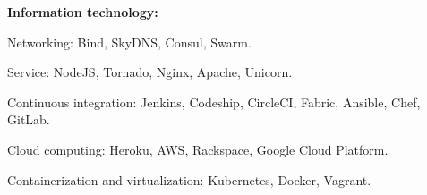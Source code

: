 \textbf{Information technology:} 
    \begin{innerlist}
\item Networking: Bind, SkyDNS, Consul, Swarm.
\item Service: NodeJS, Tornado, Nginx, Apache, Unicorn.
\item Continuous integration: Jenkins, Codeship, CircleCI,
Fabric, Ansible, Chef, GitLab.
\item Cloud computing: Heroku, AWS, Rackspace, Google Cloud Platform.
\item Containerization and virtualization: Kubernetes, Docker, Vagrant.
    \end{innerlist}

% 
% 
% 


%
% 
% 

% 

